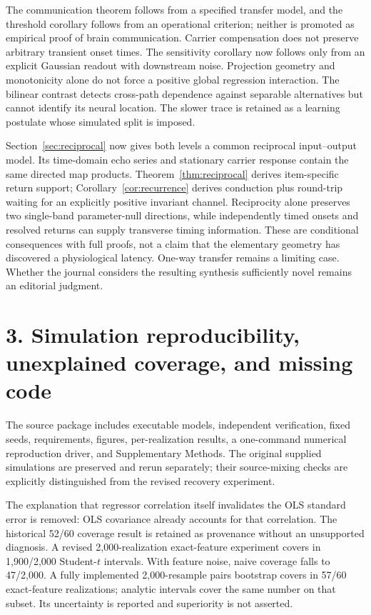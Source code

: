 \documentclass[11pt,a4paper]{article}
\begin{document}
The communication theorem follows from a specified transfer model, and the threshold corollary follows from an operational criterion; neither is promoted as empirical proof of brain communication. Carrier compensation does not preserve arbitrary transient onset times. The sensitivity corollary now follows only from an explicit Gaussian readout with downstream noise. Projection geometry and monotonicity alone do not force a positive global regression interaction. The bilinear contrast detects cross-path dependence against separable alternatives but cannot identify its neural location. The slower trace is retained as a learning postulate whose simulated split is imposed.

Section~\ref{sec:reciprocal} now gives both levels a common reciprocal input--output model. Its time-domain echo series and stationary carrier response contain the same directed map products. Theorem~\ref{thm:reciprocal} derives item-specific return support; Corollary~\ref{cor:recurrence} derives conduction plus round-trip waiting for an explicitly positive invariant channel. Reciprocity alone preserves two single-band parameter-null directions, while independently timed onsets and resolved returns can supply transverse timing information. These are conditional consequences with full proofs, not a claim that the elementary geometry has discovered a physiological latency. One-way transfer remains a limiting case. Whether the journal considers the resulting synthesis sufficiently novel remains an editorial judgment.

\section*{3. Simulation reproducibility, unexplained coverage, and missing code}
The source package includes executable models, independent verification, fixed seeds, requirements, figures, per-realization results, a one-command numerical reproduction driver, and Supplementary Methods. The original supplied simulations are preserved and rerun separately; their source-mixing checks are explicitly distinguished from the revised recovery experiment.

The explanation that regressor correlation itself invalidates the OLS standard error is removed: OLS covariance already accounts for that correlation. The historical 52/60 coverage result is retained as provenance without an unsupported diagnosis. A revised 2,000-realization exact-feature experiment covers in 1,900/2,000 Student-$t$ intervals. With feature noise, naive coverage falls to 47/2,000. A fully implemented 2,000-resample pairs bootstrap covers in 57/60 exact-feature realizations; analytic intervals cover the same number on that subset. Its uncertainty is reported and superiority is not asserted.
\end{document}
